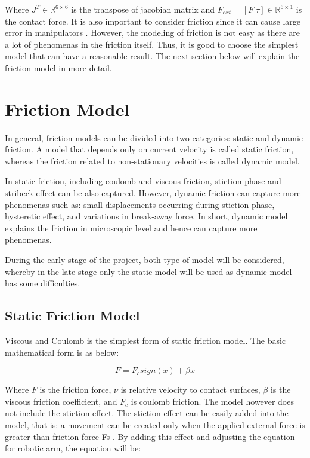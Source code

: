 Where $J^{T} \in \mathbb{R}^{6 \times 6}$ is the transpose of jacobian matrix and $F_{ext} = \left[F \;   \tau\right] \in \mathbb{R}^{6 \times 1}$ is the contact force. It is also important to consider friction since it can cause large error in manipulators \cite{aaaaa}. However, the modeling of friction is not easy as there are a lot of phenomenas in the friction itself. Thus, it is good to choose the simplest model that can have a reasonable result. The next section below will explain the friction model in more detail.

\section{Friction Model}
In general, friction models can be divided into two categories: static and dynamic friction. A model that depends only on current velocity is called static friction, whereas the friction related to non-stationary velocities is called dynamic model. 

In static friction, including coulomb and viscous friction, stiction phase and stribeck effect can be also captured. However, dynamic friction can capture more phenomenas such as: small displacements occurring during stiction phase, hysteretic effect, and variations in break-away force. In short, dynamic model explains the friction in microscopic level and hence can capture more phenomenas. 

During the early stage of the project, both type of model will be considered, whereby in the late stage only the static model will be used as dynamic model has some difficulties.

\subsection{Static Friction Model}
Viscous and Coulomb is the simplest form of static friction model. The basic mathematical form is as below:

\begin{equation}
  F = F_{c} sign\left(\dot{x}\right) + \beta \dot{x}
\end{equation}

Where $F$ is the friction force, $\nu$ is relative velocity to contact surfaces, $\beta$ is the viscous friction coefficient, and $F_{c}$ is coulomb friction. The model however does not include the stiction effect. The stiction effect can be easily added into the model, that is: a movement can be created only when the applied external force is greater than friction force Fs \cite{Bona05}. By adding this effect and adjusting the equation for robotic arm, the equation will be:


